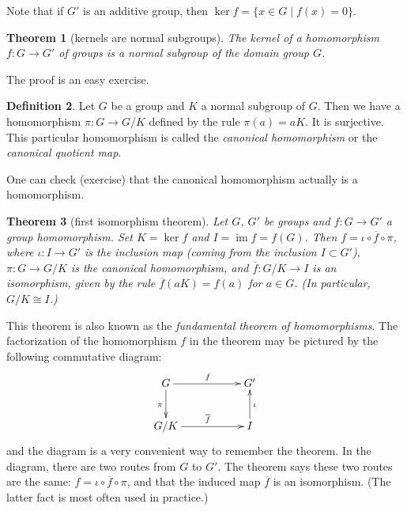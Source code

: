 \documentclass[11pt]{article}
\newtheorem{thm}{Theorem}[section]
\theoremstyle{definition}
\newtheorem{defn}[thm]{Definition}
\newcommand{\compose}{\circ} %
\newcommand{\im}{\operatorname{im}}
\begin{document}
Note that if $G'$ is an additive group, then $\ker f = \{ x \in G \mid
f(x) = 0 \}$.

\begin{thm}[kernels are normal subgroups]\label{KAN} 
The kernel of a homomorphism $f: G \to G'$ of groups is a normal
subgroup of the domain group $G$.
\end{thm}

The proof is an easy exercise.

\begin{defn}\label{canhom}
Let $G$ be a group and $K$ a normal subgroup of $G$. Then we have a
homomorphism $\pi: G \to G/K$ defined by the rule $\pi(a) = aK$. It is
surjective. This particular homomorphism is called the {\em canonical
  homomorphism} or the \emph{canonical quotient map}.
\end{defn}

One can check (exercise) that the canonical homomorphism actually is a
homomorphism.

\begin{thm}[first isomorphism theorem] \label{thm:first-iso}
  Let $G$, $G'$ be groups and $f:G \to G'$ a group homomorphism. Set
  $K=\ker f$ and $I=\im f = f(G)$.  Then
  $f = \iota \compose \overline{f} \compose \pi$, where
  $\iota: I \to G'$ is the inclusion map (coming from the inclusion
  $I \subset G'$), $\pi: G \to G/K$ is the canonical homomorphism, and
  $\overline{f}: G/K \to I$ is an isomorphism, given by the rule
  $\overline{f}(aK) = f(a)$ for $a\in G$.  (In particular,
  $G/K \cong I$.)
\end{thm}

This theorem is also known as the {\em fundamental theorem of
  homomorphisms}. The
factorization of the homomorphism $f$ in the theorem may be pictured
by the following commutative diagram:
\[
\xymatrix{ 
G \ar[rr]^f \ar[d]_\pi &&  G'  \\
G/K \ar[rr]^{\overline{f}} && I \ar[u]_\iota 
}
\] 
and the diagram is a very convenient way to remember the theorem.  In
the diagram, there are two routes from $G$ to $G'$. The theorem says
these two routes are the same: $f = \iota \compose \overline{f}
\compose \pi$, and that the induced map $\overline{f}$ is an
isomorphism. (The latter fact is most often used in practice.)
\end{document}
